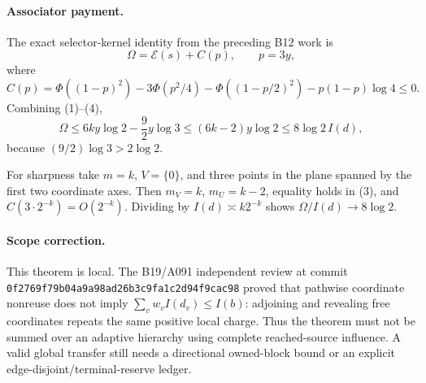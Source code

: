 \paragraph{Associator payment.}
The exact selector-kernel identity from the preceding B12 work is
\[
 \Omega=\mathcal E(s)+C(p),\qquad p=3y,
\]
where
\[
 C(p)=\Phi((1-p)^2)-3\Phi(p^2/4)-\Phi((1-p/2)^2)
      -p(1-p)\log4\leq0.                              \tag{4}
\]
Combining (1)--(4),
\[
 \Omega\leq 6ky\log2-\frac92y\log3
 \leq (6k-2)y\log2
 \leq8\log2\,I(d),
\]
because $(9/2)\log3>2\log2$.

For sharpness take $m=k$, $V=\{0\}$, and three points in the plane spanned
by the first two coordinate axes.  Then $m_V=k$, $m_U=k-2$, equality holds
in (3), and $C(3\cdot2^{-k})=O(2^{-k})$.  Dividing by
$I(d)\asymp k2^{-k}$ shows $\Omega/I(d)\to8\log2$.

\paragraph{Scope correction.}
This theorem is local.  The B19/A091 independent review at commit
\texttt{0f2769f79b04a9a98ad26b3c9fa1c2d94f9cac98} proved that pathwise
coordinate nonreuse does not imply
$\sum_vw_vI(d_v)\leq I(b)$: adjoining and revealing free coordinates repeats
the same positive local charge.  Thus the theorem must not be summed over an
adaptive hierarchy using complete reached-source influence.  A valid global
transfer still needs a directional owned-block bound or an explicit
edge-disjoint/terminal-reserve ledger.

